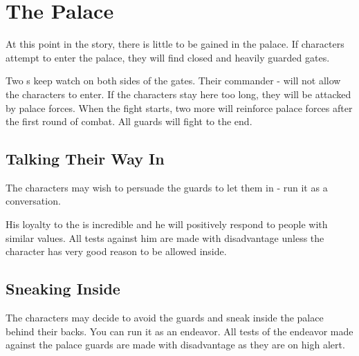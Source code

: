 \section{The Palace}
\label{sec:closedPalace}

At this point in the story, there is little to be gained in the palace. If characters attempt to enter the palace, they will find closed and heavily guarded gates.


Two \enemyQueensGuard{}s keep watch on both sides of the gates. Their commander - \enemyQueensGuardLeader{} will not allow the characters to enter. If the characters stay here too long, they will be attacked by palace forces. When the fight starts, two more \enemyQueensGuard{} will reinforce palace forces after the first round of combat. All guards will fight to the end.



\subsection{Talking Their Way In}

The characters may wish to persuade the guards to let them in - run it as a conversation.

His loyalty to the \npcQueen{} is incredible and he will positively respond to people with similar values.
All tests against him are made with disadvantage unless the character has very good reason to be allowed inside.




\subsection{Sneaking Inside}

The characters may decide to avoid the guards and sneak inside the palace behind their backs. You can run it as an endeavor.
All tests of the endeavor made against the palace guards are made with disadvantage as they are on high alert.

